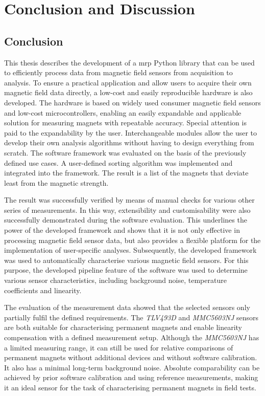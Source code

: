 \hypertarget{conclusion-and-discussion}{%
\chapter{Conclusion and Discussion}\label{conclusion-and-discussion}}

\hypertarget{conclusion}{%
\section{Conclusion}\label{conclusion}}

This thesis describes the development of a \gls{mrp} Python library that
can be used to efficiently process data from magnetic field sensors from
acquisition to analysis. To ensure a practical application and allow
users to acquire their own magnetic field data directly, a low-cost and
easily reproducible hardware is also developed. The hardware is based on
widely used consumer magnetic field sensors and low-cost
microcontrollers, enabling an easily expandable and applicable solution
for measuring magnets with repeatable accuracy. Special attention is
paid to the expandability by the user. Interchangeable modules allow the
user to develop their own analysis algorithms without having to design
everything from scratch. The software framework was evaluated on the
basis of the previously defined use cases. A user-defined sorting
algorithm was implemented and integrated into the framework. The result
is a list of the magnets that deviate least from the magnetic strength.

The result was successfully verified by means of manual checks for
various other series of measurements. In this way, extensibility and
customisability were also successfully demonstrated during the software
evaluation. This underlines the power of the developed framework and
shows that it is not only effective in processing magnetic field sensor
data, but also provides a flexible platform for the implementation of
user-specific analyses. Subsequently, the developed framework was used
to automatically characterise various magnetic field sensors. For this
purpose, the developed pipeline feature of the software was used to
determine various sensor characteristics, including background noise,
temperature coefficients and linearity.

The evaluation of the measurement data showed that the selected sensors
only partially fulfil the defined requirements. The \emph{TLV493D} and
\emph{MMC5603NJ} sensors are both suitable for characterising permanent
magnets and enable linearity compensation with a defined measurement
setup. Although the \emph{MMC5603NJ} has a limited measuring range, it
can still be used for relative comparisons of permanent magnets without
additional devices and without software calibration. It also has a
minimal long-term background noise. Absolute comparability can be
achieved by prior software calibration and using reference measurements,
making it an ideal sensor for the task of characterising permanent
magnets in field tests.

